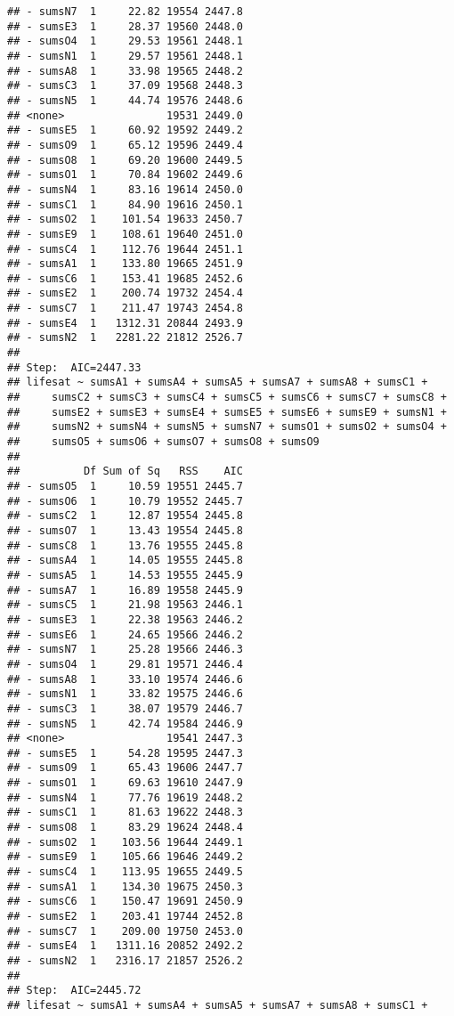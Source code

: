 \documentclass[,man,floatsintext]{apa6}
\begin{document}
\begin{verbatim}
## - sumsN7  1     22.82 19554 2447.8
## - sumsE3  1     28.37 19560 2448.0
## - sumsO4  1     29.53 19561 2448.1
## - sumsN1  1     29.57 19561 2448.1
## - sumsA8  1     33.98 19565 2448.2
## - sumsC3  1     37.09 19568 2448.3
## - sumsN5  1     44.74 19576 2448.6
## <none>                19531 2449.0
## - sumsE5  1     60.92 19592 2449.2
## - sumsO9  1     65.12 19596 2449.4
## - sumsO8  1     69.20 19600 2449.5
## - sumsO1  1     70.84 19602 2449.6
## - sumsN4  1     83.16 19614 2450.0
## - sumsC1  1     84.90 19616 2450.1
## - sumsO2  1    101.54 19633 2450.7
## - sumsE9  1    108.61 19640 2451.0
## - sumsC4  1    112.76 19644 2451.1
## - sumsA1  1    133.80 19665 2451.9
## - sumsC6  1    153.41 19685 2452.6
## - sumsE2  1    200.74 19732 2454.4
## - sumsC7  1    211.47 19743 2454.8
## - sumsE4  1   1312.31 20844 2493.9
## - sumsN2  1   2281.22 21812 2526.7
## 
## Step:  AIC=2447.33
## lifesat ~ sumsA1 + sumsA4 + sumsA5 + sumsA7 + sumsA8 + sumsC1 + 
##     sumsC2 + sumsC3 + sumsC4 + sumsC5 + sumsC6 + sumsC7 + sumsC8 + 
##     sumsE2 + sumsE3 + sumsE4 + sumsE5 + sumsE6 + sumsE9 + sumsN1 + 
##     sumsN2 + sumsN4 + sumsN5 + sumsN7 + sumsO1 + sumsO2 + sumsO4 + 
##     sumsO5 + sumsO6 + sumsO7 + sumsO8 + sumsO9
## 
##          Df Sum of Sq   RSS    AIC
## - sumsO5  1     10.59 19551 2445.7
## - sumsO6  1     10.79 19552 2445.7
## - sumsC2  1     12.87 19554 2445.8
## - sumsO7  1     13.43 19554 2445.8
## - sumsC8  1     13.76 19555 2445.8
## - sumsA4  1     14.05 19555 2445.8
## - sumsA5  1     14.53 19555 2445.9
## - sumsA7  1     16.89 19558 2445.9
## - sumsC5  1     21.98 19563 2446.1
## - sumsE3  1     22.38 19563 2446.2
## - sumsE6  1     24.65 19566 2446.2
## - sumsN7  1     25.28 19566 2446.3
## - sumsO4  1     29.81 19571 2446.4
## - sumsA8  1     33.10 19574 2446.6
## - sumsN1  1     33.82 19575 2446.6
## - sumsC3  1     38.07 19579 2446.7
## - sumsN5  1     42.74 19584 2446.9
## <none>                19541 2447.3
## - sumsE5  1     54.28 19595 2447.3
## - sumsO9  1     65.43 19606 2447.7
## - sumsO1  1     69.63 19610 2447.9
## - sumsN4  1     77.76 19619 2448.2
## - sumsC1  1     81.63 19622 2448.3
## - sumsO8  1     83.29 19624 2448.4
## - sumsO2  1    103.56 19644 2449.1
## - sumsE9  1    105.66 19646 2449.2
## - sumsC4  1    113.95 19655 2449.5
## - sumsA1  1    134.30 19675 2450.3
## - sumsC6  1    150.47 19691 2450.9
## - sumsE2  1    203.41 19744 2452.8
## - sumsC7  1    209.00 19750 2453.0
## - sumsE4  1   1311.16 20852 2492.2
## - sumsN2  1   2316.17 21857 2526.2
## 
## Step:  AIC=2445.72
## lifesat ~ sumsA1 + sumsA4 + sumsA5 + sumsA7 + sumsA8 + sumsC1 + 

\end{verbatim}
\end{document}
